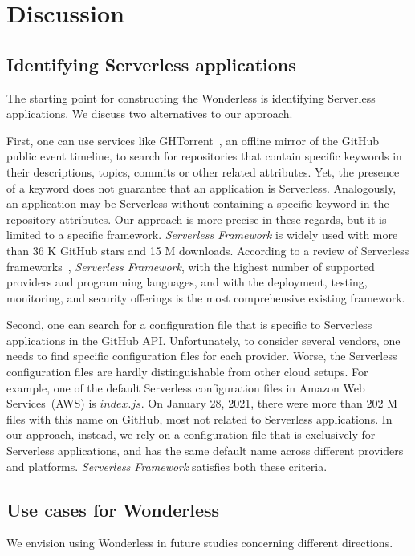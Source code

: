 
\section{Discussion}
\label{discussion}

\subsection{Identifying Serverless applications} \label{discOnSF}
The starting point for constructing the Wonderless is identifying Serverless 
applications. We discuss two alternatives to our approach.

First, one can use services like GHTorrent~\cite{gousios2012ghtorrent}, 
an offline mirror of the GitHub public event timeline, to search for repositories 
that contain specific keywords in their descriptions, topics, commits or other 
related attributes. Yet, the presence of a keyword does not guarantee 
that an application is Serverless. Analogously, an application may be Serverless 
without containing a specific keyword in the repository attributes.
Our approach is more precise in these regards, 
but it is limited to a specific framework. 
\emph{Serverless Framework} is widely used with more than 36 K GitHub stars 
and 15 M downloads. According to a review of Serverless 
frameworks~\cite{kritikos2018review}, \emph{Serverless Framework},
with the highest number of supported providers 
and programming languages, and with the deployment, testing, 
monitoring, and security offerings is the most comprehensive existing framework. 

Second, one can search for a configuration file that is 
specific to Serverless applications in the GitHub API. Unfortunately, to consider several vendors, 
one needs to find specific configuration files for each provider.
Worse, the Serverless configuration files are hardly distinguishable from other cloud setups. 
For example, one of the default Serverless configuration files in Amazon 
Web Services~(AWS) is $index.js$. On January 28, 2021, there were 
more than 202 M files with this name on GitHub, most not 
related to Serverless applications. 
In our approach, instead, we rely on a configuration file that is exclusively 
for Serverless applications, and has the same default name across 
different providers and platforms. \emph{Serverless Framework} 
satisfies both these criteria.

\subsection{Use cases for Wonderless}
We envision using Wonderless in future studies 
concerning different directions.

